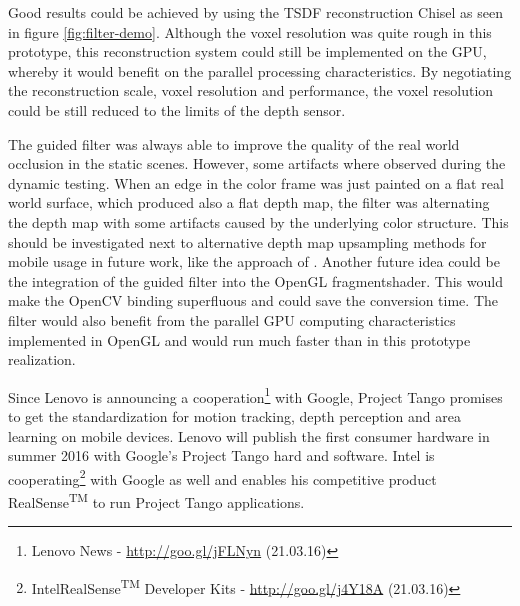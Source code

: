 \documentclass[12pt]{support/thcolognereport}
\begin{document}
Good results could be achieved by using the TSDF reconstruction Chisel as seen in figure \ref{fig:filter-demo}. Although the voxel resolution was quite rough in this prototype, this reconstruction system could still be implemented on the GPU, whereby it would benefit on the parallel processing characteristics. By negotiating the reconstruction scale, voxel resolution and performance, the voxel resolution could be still reduced to the limits of the depth sensor.

The guided filter was always able to improve the quality of the real world occlusion in the static scenes. However, some artifacts where observed during the dynamic testing. When an edge in the color frame was just painted on a flat real world surface, which produced also a flat depth map, the filter was alternating the depth map with some artifacts caused by the underlying color structure. This should be investigated next to alternative depth map upsampling methods for mobile usage in future work, like the approach of \citet{Ferstl_2013_ICCV}. Another future idea could be the integration of the guided filter into the OpenGL fragmentshader. This would make the OpenCV binding superfluous and could save the conversion time. The filter would also benefit from the parallel GPU computing characteristics implemented in OpenGL and would run much faster than in this prototype realization. 

Since Lenovo is announcing a cooperation\footnote{Lenovo News - \url{http://goo.gl/jFLNyn} (21.03.16)} with Google, Project Tango promises to get the standardization for motion tracking, depth perception and area learning on mobile devices. Lenovo will publish the first consumer hardware in summer 2016 with Google's Project Tango hard and software. Intel is cooperating\footnote{Intel\textregistered RealSense\textsuperscript{TM} Developer Kits - \url{http://goo.gl/j4Y18A} (21.03.16)} with Google as well and enables his competitive product RealSense\textsuperscript{TM} to run Project Tango applications.

\setlength{\parskip}{0em}



 
\end{document}
